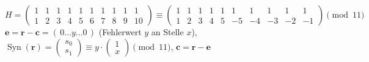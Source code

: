 \begin{algorithmus}
\[
H = \begin{pmatrix}
1 & 1 & 1 & 1 & 1 & 1 & 1 & 1 & 1 & 1\\
1 & 2 & 3 & 4 & 5 & 6 & 7 & 8 & 9 & 10
\end{pmatrix}
\equiv
\begin{pmatrix}
1 & 1 & 1 & 1 & 1 & 1 & 1 & 1 & 1 & 1\\
1 & 2 & 3 & 4 & 5 & -5 & -4 & -3 & -2 & -1
\end{pmatrix}
\pmod{11}
\]
$\mathbf{e} = \mathbf{r} - \mathbf{c} = (\,0 \dots y \dots 0\,)$ (Fehlerwert $y$ an Stelle $x$), \quad
$\operatorname{Syn}(\mathbf{r}) = \begin{pmatrix} s_0\\ s_1 \end{pmatrix} \equiv y \cdot \begin{pmatrix} 1\\ x \end{pmatrix} \pmod{11}$, \quad
$\mathbf{c} = \mathbf{r} - \mathbf{e}$
\end{algorithmus}
